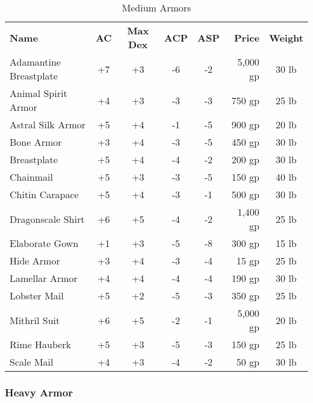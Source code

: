 \begin{table}[htb]
\caption{Medium Armors}
\centering
\begin{tabular}{l *{4}{c} r c}
\textbf{Name} & \textbf{AC} & \textbf{Max Dex} & \textbf{ACP} & \textbf{ASP} & \textbf{Price} & \textbf{Weight}\\
Adamantine Breastplate & +7 & +3 & -6 & -2 & 5,000 gp & 30 lb\\
Animal Spirit Armor & +4 & +3 & -3 & -3 & 750 gp & 25 lb\\
Astral Silk Armor & +5 & +4 & -1 & -5 & 900 gp & 20 lb\\
Bone Armor & +3 & +4 & -3 & -5 & 450 gp & 30 lb\\
Breastplate & +5 & +4 & -4 & -2 & 200 gp & 30 lb\\
Chainmail & +5 & +3 & -3 & -5 & 150 gp & 40 lb\\
Chitin Carapace & +5 & +4 & -3 & -1 & 500 gp & 30 lb\\
Dragonscale Shirt & +6 & +5 & -4 & -2 & 1,400 gp & 25 lb\\
Elaborate Gown & +1 & +3 & -5 & -8 & 300 gp & 15 lb\\
Hide Armor & +3 & +4 & -3 & -4 & 15 gp & 25 lb\\
Lamellar Armor & +4 & +4 & -4 & -4 & 190 gp & 30 lb\\
Lobster Mail & +5 & +2 & -5 & -3 & 350 gp & 25 lb\\
Mithril Suit & +6 & +5 & -2 & -1 & 5,000 gp & 20 lb\\
Rime Hauberk & +5 & +3 & -5 & -3 & 150 gp & 25 lb\\
Scale Mail & +4 & +3 & -4 & -2 & 50 gp & 30 lb\\
\end{tabular}
\end{table}


\subsubsection{Heavy Armor}

